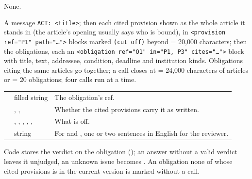  None.

 A message \texttt{ACT: <title>}; then each cited
provision shown as the whole article it stands in (the article's opening usually says who is
bound), in \texttt{<provision ref="P1" path="…">} blocks marked \texttt{(cut off)} beyond
 = 20{,}000 characters; then the obligations, each an
\texttt{<obligation ref="O1" in="P1, P3" cites="…">} block with title, text, addressee,
condition, deadline and institution kinds. Obligations citing the same articles go together;
a call closes at  = 24{,}000 characters of articles or
 = 20 obligations; four calls run at a time.

\par\nopagebreak
\begin{xltabular}{\textwidth}{@{}L{38mm}L{40mm}Y@{}}
\toprule
{} &  &  \\
\midrule
\endhead
\bottomrule
\endlastfoot
{} & filled string & The obligation's ref. \\
 & , ,  & Whether the cited provisions carry it as written. \\
 & , , , , ,  & What is off. \\
 & string & For  and , one or two sentences in English for the reviewer. \\
\end{xltabular}

Code stores the verdict on the obligation (); an answer without a valid
verdict leaves it unjudged, an unknown issue becomes . An obligation none of whose
cited provisions is in the current version is marked  without a call.

